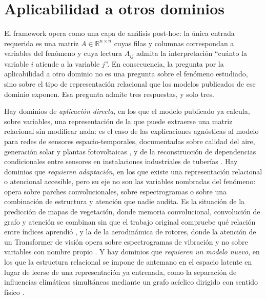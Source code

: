 
\section{Aplicabilidad a otros dominios}

El framework opera como una capa de análisis post-hoc: la única entrada requerida es una matriz $A\in\mathbb{R}^{n\times n}$ cuyas filas y columnas correspondan a variables del fenómeno y cuya lectura $A_{ij}$ admita la interpretación ``cuánto la variable $i$ atiende a la variable $j$''. En consecuencia, la pregunta por la aplicabilidad a otro dominio no es una pregunta sobre el fenómeno estudiado, sino sobre el tipo de representación relacional que los modelos publicados de ese dominio exponen. Esa pregunta admite tres respuestas, y solo tres.

Hay dominios de \emph{aplicación directa}, en los que el modelo publicado ya calcula, sobre variables, una representación de la que puede extraerse una matriz relacional sin modificar nada: es el caso de las explicaciones agnósticas al modelo para redes de sensores espacio-temporales, documentadas sobre calidad del aire, generación solar y plantas fotovoltaicas \cite{spatiotemporal2024e2e}, y de la reconstrucción de dependencias condicionales entre sensores en instalaciones industriales de tuberías \cite{pipeline2026causalgraph}. Hay dominios que \emph{requieren adaptación}, en los que existe una representación relacional o atencional accesible, pero su eje no son las variables nombradas del fenómeno: opera sobre parches convolucionales, sobre espectrogramas o sobre una combinación de estructura y atención que nadie audita. Es la situación de la predicción de mapas de vegetación, donde memoria convolucional, convolución de grafo y atención se combinan sin que el trabajo original compruebe qué relación entre índices aprendió \cite{convlstmgcn2026vegetation}, y la de la aerodinámica de rotores, donde la atención de un Transformer de visión opera sobre espectrogramas de vibración y no sobre variables con nombre propio \cite{rotorcraft2026vortexring}. Y hay dominios que \emph{requieren un modelo nuevo}, en los que la estructura relacional se impone de antemano en el espacio latente en lugar de leerse de una representación ya entrenada, como la separación de influencias climáticas simultáneas mediante un grafo acíclico dirigido con sentido físico \cite{teleconnections2026causal}.

